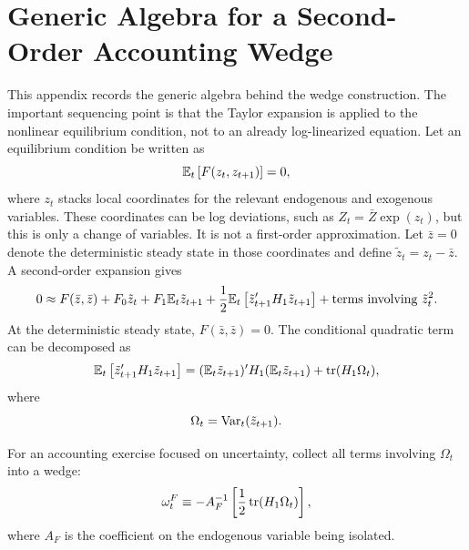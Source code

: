 \section{Generic Algebra for a Second-Order Accounting Wedge}

This appendix records the generic algebra behind the wedge construction. The
important sequencing point is that the Taylor expansion is applied to the
nonlinear equilibrium condition, not to an already log-linearized equation. Let
an equilibrium condition be written as
\begin{equation}
    \mathbb{E}_t
    \left[
        F(z_t,z_{t+1})
    \right]
    =
    0,
    \label{eq:generic_equilibrium_condition}
\end{equation}
where \(z_t\) stacks local coordinates for the relevant endogenous and exogenous
variables. These coordinates can be log deviations, such as
\(Z_t=\bar{Z}\exp(z_t)\), but this is only a change of variables. It is not a
first-order approximation. Let \(\bar{z}=0\) denote the deterministic steady
state in those coordinates and define \(\tilde{z}_t=z_t-\bar{z}\). A
second-order expansion gives
\begin{equation}
    0
    \approx
    F(\bar{z},\bar{z})
    +
    F_0 \tilde{z}_t
    +
    F_1 \mathbb{E}_t \tilde{z}_{t+1}
    +
    \frac{1}{2}
    \mathbb{E}_t
    \left[
        \tilde{z}_{t+1}'
        H_1
        \tilde{z}_{t+1}
    \right]
    +
    \text{terms involving } \tilde{z}_t^2.
    \label{eq:generic_second_order_expansion}
\end{equation}
At the deterministic steady state, \(F(\bar{z},\bar{z})=0\). The conditional
quadratic term can be decomposed as
\begin{equation}
    \mathbb{E}_t
    \left[
        \tilde{z}_{t+1}'
        H_1
        \tilde{z}_{t+1}
    \right]
    =
    (\mathbb{E}_t\tilde{z}_{t+1})'
    H_1
    (\mathbb{E}_t\tilde{z}_{t+1})
    +
    \operatorname{tr}(H_1\Omega_t),
    \label{eq:mean_variance_decomposition}
\end{equation}
where
\begin{equation}
    \Omega_t
    =
    \operatorname{Var}_t(\tilde{z}_{t+1}).
    \label{eq:omega_covariance}
\end{equation}

For an accounting exercise focused on uncertainty, collect all terms involving
\(\Omega_t\) into a wedge:
\begin{equation}
    \omega^F_t
    \equiv
    -A_F^{-1}
    \left[
        \frac{1}{2}\operatorname{tr}(H_1\Omega_t)
    \right],
    \label{eq:generic_wedge}
\end{equation}
where \(A_F\) is the coefficient on the endogenous variable being isolated.


